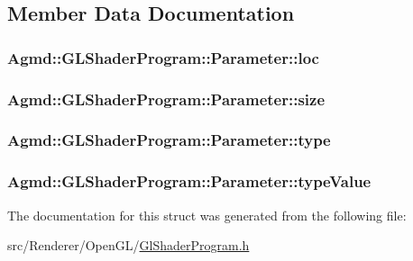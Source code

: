 \subsection{Member Data Documentation}
\hypertarget{struct_agmd_1_1_g_l_shader_program_1_1_parameter_ab6822576267384e3c183dd93fceec9fd}{
\subsubsection[{loc}]{ Agmd\+::\+G\+L\+Shader\+Program\+::\+Parameter\+::loc}}\label{struct_agmd_1_1_g_l_shader_program_1_1_parameter_ab6822576267384e3c183dd93fceec9fd}
\hypertarget{struct_agmd_1_1_g_l_shader_program_1_1_parameter_acc0db24dc0df7fd90128ca251f89a26d}{
\subsubsection[{size}]{ Agmd\+::\+G\+L\+Shader\+Program\+::\+Parameter\+::size}}\label{struct_agmd_1_1_g_l_shader_program_1_1_parameter_acc0db24dc0df7fd90128ca251f89a26d}
\hypertarget{struct_agmd_1_1_g_l_shader_program_1_1_parameter_a02afcff2c6ba67f904b190fe2e0f761d}{
\subsubsection[{type}]{ Agmd\+::\+G\+L\+Shader\+Program\+::\+Parameter\+::type}}\label{struct_agmd_1_1_g_l_shader_program_1_1_parameter_a02afcff2c6ba67f904b190fe2e0f761d}
\hypertarget{struct_agmd_1_1_g_l_shader_program_1_1_parameter_a9453ce46a8627caf9f3cae2cf72f0836}{
\subsubsection[{type\+Value}]{ Agmd\+::\+G\+L\+Shader\+Program\+::\+Parameter\+::type\+Value}}\label{struct_agmd_1_1_g_l_shader_program_1_1_parameter_a9453ce46a8627caf9f3cae2cf72f0836}


The documentation for this struct was generated from the following file\+:\begin{DoxyCompactItemize}
\item 
src/\+Renderer/\+Open\+G\+L/\hyperlink{_gl_shader_program_8h}{Gl\+Shader\+Program.\+h}\end{DoxyCompactItemize}
